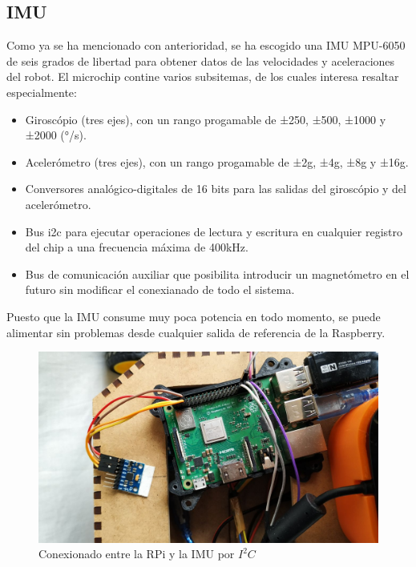 \subsection{IMU}\label{imu_hardw}
Como ya se ha mencionado con anterioridad, se ha escogido una IMU MPU-6050 de seis grados de libertad para obtener datos de las velocidades y aceleraciones del robot. El microchip contine varios subsitemas, de los cuales interesa resaltar especialmente:
\begin{itemize}
	\item Giroscópio (tres ejes), con un rango progamable de ±250, ±500, ±1000 y ±2000 (°/s).
	\item Acelerómetro (tres ejes), con un rango progamable de ±2g, ±4g, ±8g y ±16g.
	\item Conversores analógico-digitales de 16 bits para las salidas del giroscópio y del acelerómetro.
	\item Bus i2c para ejecutar operaciones de lectura y escritura en cualquier registro del chip a una frecuencia máxima de 400kHz.
	\item Bus de comunicación auxiliar que posibilita introducir un magnetómetro en el futuro sin modificar el conexianado de todo el sistema.
\end{itemize}
Puesto que la IMU consume muy poca potencia en todo momento, se puede alimentar sin problemas desde cualquier salida de referencia de la Raspberry. \\

\begin{figure}[h!]
	\centering
	\includegraphics[width=.5\textwidth]{images/hw/rpi_imu}
	\caption{Conexionado entre la RPi y la IMU por $I^2C$}
\end{figure}

